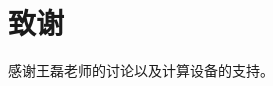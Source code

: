 \documentclass[A4,twoside,UTF8]{ctexart}
\begin{document}

\section*{致谢}

感谢王磊老师的讨论以及计算设备的支持。
\end{document}
